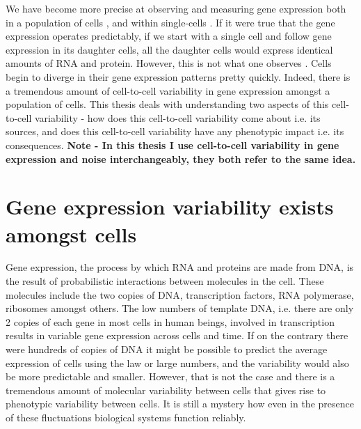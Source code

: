 We have become more precise at observing and measuring gene expression both in a population of cells \cite{griffith2015pcb}, and within single-cells \cite{macosko2015c, newman2006na, xia2019pnasu, raj2006pb}. If it were true that the gene expression operates predictably, if we start with a single cell and follow gene expression in its daughter cells, all the daughter cells would express identical amounts of RNA and protein. However, this is not what one observes \cite{elowitz_stochastic_2002}. Cells begin to diverge in their gene expression patterns pretty quickly. Indeed, there is a tremendous amount of cell-to-cell variability in gene expression amongst a population of cells. This thesis deals with understanding two aspects of this cell-to-cell variability - how does this cell-to-cell variability come about i.e. its sources, and does this cell-to-cell variability have any phenotypic impact i.e. its consequences. \textbf{Note - In this thesis I use cell-to-cell variability in gene expression and noise interchangeably, they both refer to the same idea.}

\section{Gene expression variability exists amongst cells}

Gene expression, the process by which RNA and proteins are made from DNA, is the result of probabilistic interactions between molecules in the cell. These molecules include the two copies of DNA, transcription factors, RNA polymerase, ribosomes amongst others. The low numbers of template DNA, i.e. there are only 2 copies of each gene in most cells in human beings, involved in transcription results in variable gene expression across cells and time. If on the contrary there were hundreds of copies of DNA it might be possible to predict the average expression of cells using the law or large numbers, and the variability would also be more predictable and smaller. However, that is not the case and there is a tremendous amount of molecular variability between cells that gives rise to phenotypic variability between cells. It is still a mystery how even in the presence of these fluctuations  biological systems function reliably.

